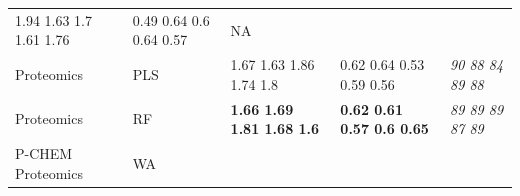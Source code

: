 \documentclass[utf8]{frontiersHLTH} %
\begin{document}
\begin{longtable}[]{@{}lllll@{}}
\begin{minipage}[t]{0.19\columnwidth}
1.94 1.63 1.7 1.61 1.76\strut
\end{minipage} & \begin{minipage}[t]{0.19\columnwidth}\raggedright\strut
0.49 0.64 0.6 0.64 0.57\strut
\end{minipage} & \begin{minipage}[t]{0.27\columnwidth}\raggedright\strut
NA\strut
\end{minipage}\tabularnewline
\begin{minipage}[t]{0.13\columnwidth}\raggedright\strut
Proteomics\strut
\end{minipage} & \begin{minipage}[t]{0.08\columnwidth}\raggedright\strut
PLS\strut
\end{minipage} & \begin{minipage}[t]{0.19\columnwidth}\raggedright\strut
1.67 1.63 1.86 1.74 1.8\strut
\end{minipage} & \begin{minipage}[t]{0.19\columnwidth}\raggedright\strut
0.62 0.64 0.53 0.59 0.56\strut
\end{minipage} & \begin{minipage}[t]{0.27\columnwidth}\raggedright\strut
\emph{90 88 84 89 88}\strut
\end{minipage}\tabularnewline
\begin{minipage}[t]{0.13\columnwidth}\raggedright\strut
Proteomics\strut
\end{minipage} & \begin{minipage}[t]{0.08\columnwidth}\raggedright\strut
RF\strut
\end{minipage} & \begin{minipage}[t]{0.19\columnwidth}\raggedright\strut
\textbf{1.66 1.69 1.81 1.68 1.6}\strut
\end{minipage} & \begin{minipage}[t]{0.19\columnwidth}\raggedright\strut
\textbf{0.62 0.61 0.57 0.6 0.65}\strut
\end{minipage} & \begin{minipage}[t]{0.27\columnwidth}\raggedright\strut
\emph{89 89 89 87 89}\strut
\end{minipage}\tabularnewline
\begin{minipage}[t]{0.13\columnwidth}\raggedright\strut
P-CHEM Proteomics\strut
\end{minipage} & \begin{minipage}[t]{0.08\columnwidth}\raggedright\strut
WA\strut
\end{minipage} & \begin{minipage}[t]{0.19\columnwidth}\raggedright\strut

\end{minipage}
\end{longtable}
\end{document}
